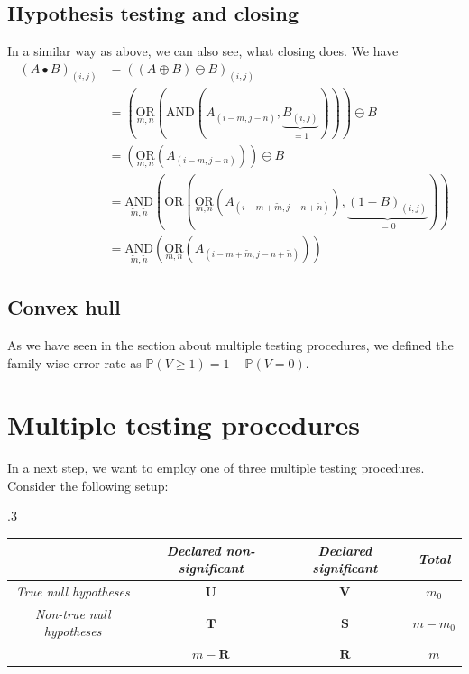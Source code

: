 \documentclass[a4paper,12pt]{article}
\theoremstyle{plain}
\theoremstyle{definition}
\theoremstyle{remark}
\begin{document}
\subsection{Hypothesis testing and closing}
In a similar way as above, we can also see, what closing does. We have
\begin{align*}
	(A \bullet B)_{(i, j)} &= ((A \oplus B) \ominus B)_{(i, j)} \\
	&= \left( \underset{m, n}{\mathrm{OR}} \left( \mathrm{AND} (A_{(i - m, j - n)}, \underbrace{B_{(i, j)}}_{= 1} ) \right) \right) \ominus B \\
	&= \left( \underset{m, n}{\mathrm{OR}} ( A_{(i - m, j - n)} ) \right) \ominus B \\
	&= \underset{\tilde{m}, \tilde{n}}{\mathrm{AND}} \left( \mathrm{OR} \left( \underset{m, n}{\mathrm{OR}} ( A_{(i - m + \tilde{m}, j - n + \tilde{n})} ), \underbrace{(1 - B)_{(i, j)}}_{= 0} \right) \right) \\
	&= \underset{\tilde{m}, \tilde{n}}{\mathrm{AND}} \left( \underset{m, n}{\mathrm{OR}} ( A_{(i - m + \tilde{m}, j - n + \tilde{n})} ) \right)
\end{align*}

\subsection{Convex hull}

As we have seen in the section about multiple testing procedures, we defined the family-wise error rate as $\mathbb{P}(V \geq 1) = 1 - \mathbb{P}(V = 0)$.

\newpage

\section{Multiple testing procedures}

In a next step, we want to employ one of three multiple testing procedures. Consider the following setup:
\begin{table}[h]
	\tymax .3\textwidth
	\begin{tabulary}{\textwidth}{|CCCC|}
		\hline
		& \textit{Declared non-significant} & \textit{Declared significant} & \textit{Total} \\
		\hline
		\textit{True null hypotheses} & $\mathbf{U}$ & $\mathbf{V}$ & $m_0$ \\
		\textit{Non-true null hypotheses} & $\mathbf{T}$ & $\mathbf{S}$ & $m - m_0$ \\
		& $m - \mathbf{R}$ & $\mathbf{R}$ & $m$ \\
		\hline
	\end{tabulary}
\end{table}
\end{document}
